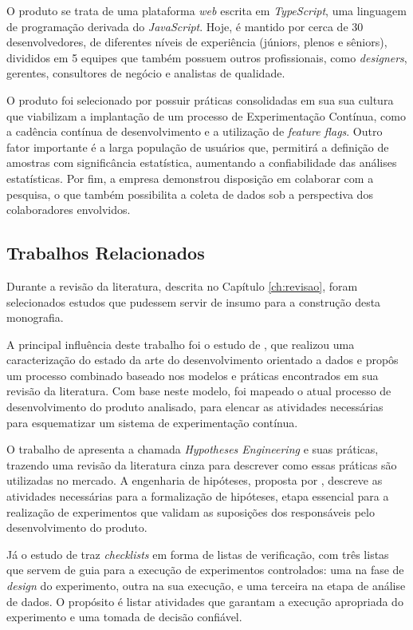 O produto se trata de uma plataforma \textit{web} escrita em \textit{TypeScript}, uma linguagem de programação derivada do \textit{JavaScript}. Hoje, é mantido por cerca de 30 desenvolvedores, de diferentes níveis de experiência (júniors, plenos e sêniors), divididos em 5 equipes que também possuem outros profissionais, como \textit{designers}, gerentes, consultores de negócio e analistas de qualidade.

O produto foi selecionado por possuir práticas consolidadas em sua sua cultura que viabilizam a implantação de um processo de Experimentação Contínua, como a cadência contínua de desenvolvimento e a utilização de \textit{feature flags}. Outro fator importante é a larga população de usuários que, permitirá a definição de amostras com significância estatística, aumentando a confiabilidade das análises estatísticas. Por fim, a empresa demonstrou disposição em colaborar com a pesquisa, o que também possibilita a coleta de dados sob a perspectiva dos colaboradores envolvidos.


\subsection{Trabalhos Relacionados}

Durante a revisão da literatura, descrita no Capítulo \ref{ch:revisao}, foram selecionados estudos que pudessem servir de insumo para a construção desta monografia.

A principal influência deste trabalho foi o estudo de , que realizou uma caracterização do estado da arte do desenvolvimento orientado a dados e propôs um processo combinado baseado nos modelos e práticas encontrados em sua revisão da literatura. Com base neste modelo, foi mapeado o atual processo de desenvolvimento do produto analisado, para elencar as atividades necessárias para esquematizar um sistema de experimentação contínua.

O trabalho de  apresenta a chamada \textit{Hypotheses Engineering} e suas práticas, trazendo uma revisão da literatura cinza para descrever como essas práticas são utilizadas no mercado. A engenharia de hipóteses, proposta por , descreve as atividades necessárias para a formalização de hipóteses, etapa essencial para a realização de experimentos que validam as suposições dos responsáveis pelo desenvolvimento do produto.

Já o estudo de \cite{fabijan_three_2019} traz \textit{checklists} em forma de listas de verificação, com três listas que servem de guia para a execução de experimentos controlados: uma na fase de \textit{design} do experimento, outra na sua execução, e uma terceira na etapa de análise de dados. O propósito é listar atividades que garantam a execução apropriada do experimento e uma tomada de decisão confiável.

